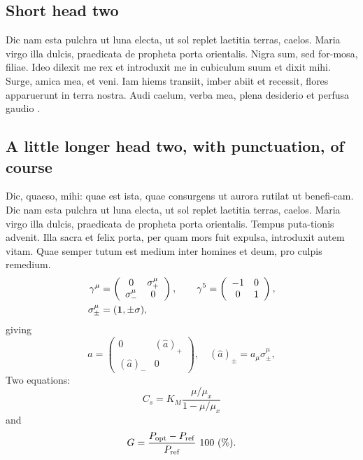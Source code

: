 \documentclass[numbers,compress]{vmsta2}
\theoremstyle{definition}
\begin{document}
\subsection{Short head two}

Dic nam esta pulchra ut luna electa, ut sol replet laetitia terras,
caelos. Maria virgo illa dulcis, praedicata de propheta porta
orientalis. Nigra sum, sed for-mosa, filiae. Ideo dilexit me rex et \cite{Anderson}
introduxit me in cubiculum suum et dixit mihi. Surge, amica mea, et
veni. Iam hiems transiit, imber abiit et recessit, flores apparuerunt in
terra nostra. Audi caelum, verba mea, plena desiderio et perfusa gaudio \cite{XiuliChao1999,powergrid1}.

\subsection{A little longer head two, with punctuation, of course}

Dic, quaeso, mihi: quae est ista, quae consurgens ut aurora rutilat
ut benefi-cam.  Dic nam esta pulchra ut luna electa, ut sol replet
laetitia terras, caelos.  Maria virgo illa dulcis, praedicata de
propheta porta orientalis. Tempus puta-tionis advenit. Illa sacra et
felix porta, per quam mors fuit expulsa, introduxit autem vitam. Quae
semper tutum est medium inter homines et deum, pro culpis remedium.
%
\begin{align}
\gamma^\mu  & =
 \left(
\begin{array}{cc}
0            & \sigma^\mu_+ \\
\sigma^\mu_- & 0
\end{array}
\right),
\qquad
\gamma^5= \left(
\begin{array}{cc}
-1 & 0 \\
0  & 1
\end{array}
\right),\nonumber \\
\sigma^\mu_{\pm}  & =    ({\bf 1} ,\pm \sigma) , \nonumber
\end{align}
giving
\begin{equation}
\hat a= \left(
\begin{array}{cc}
0          & (\hat a)_+ \\
(\hat a)_- & 0
\end{array}\right),\quad (\hat a)_\pm=a_\mu\sigma^\mu_\pm ,
\end{equation}
Two equations:
\begin{equation}
    C_{s}  =  K_{M} \frac{\mu/\mu_{x}}{1-\mu/\mu_{x}} \label{ccs}
\end{equation}
and
\begin{equation}
    G = \frac{P_{\rm opt} - P_{\rm ref}}{P_{\rm ref}} \mbox{\ }100 \mbox{\
    }(\%).
\end{equation}
\end{document}

